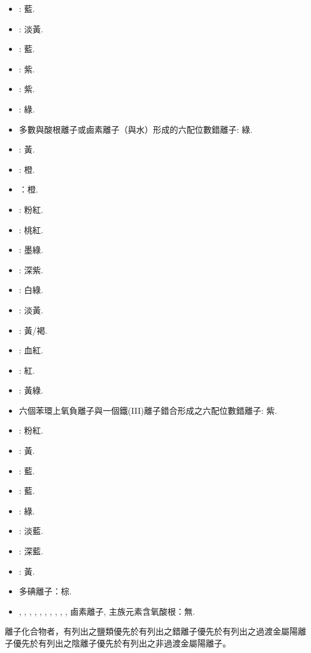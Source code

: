 \documentclass[a4paper,12pt]{report}
\begin{document}
\begin{itemize}
\item {}: 藍.
\item {}: 淡黃.
\item {}: 藍.
\item {}: 紫.
\item {}: 紫.
\item {}: 綠. 
\item 多數與酸根離子或鹵素離子（與水）形成的六配位數錯離子: 綠.
\item {}: 黃.
\item {}: 橙.
\item {}：橙.
\item {}: 粉紅.
\item {}: 桃紅.
\item {}: 墨綠.
\item {}: 深紫.
\item {}: 白綠.
\item {}: 淡黃.
\item {}: 黃/褐.
\item {}: 血紅.
\item {}: 紅.
\item {}: 黃綠.
\item 六個苯環上氧負離子與一個鐵(III)離子錯合形成之六配位數錯離子: 紫.
\item {}: 粉紅.
\item {}: 黃.
\item {}: 藍.
\item {}: 藍.
\item \ce{[Ni^{2+}}: 綠. 
\item {}: 淡藍.
\item {}: 深藍.
\item {}: 黃.
\item 多碘離子：棕.
\item {}, , , , , , , , , , 鹵素離子, 主族元素含氧酸根：無.
\end{itemize}
離子化合物者，有列出之鹽類優先於有列出之錯離子優先於有列出之過渡金屬陽離子優先於有列出之陰離子優先於有列出之非過渡金屬陽離子。
\end{document}
